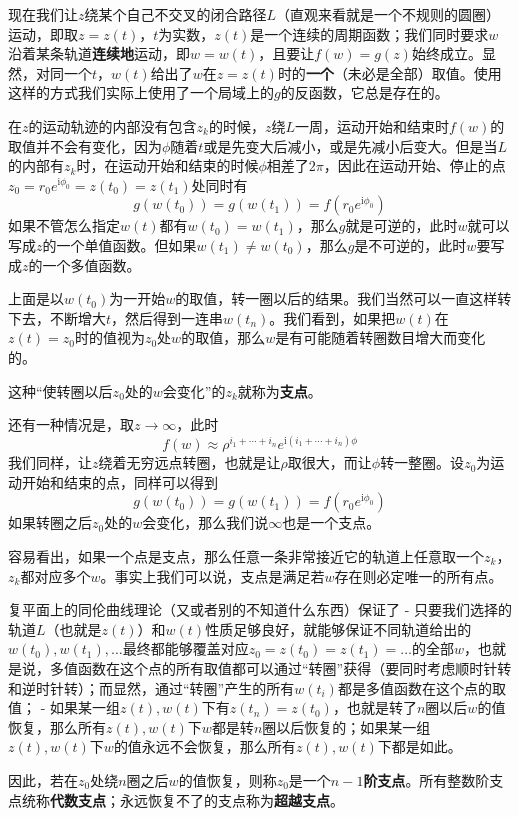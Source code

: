 \documentclass[UTF8]{ctexart}
\begin{document}
现在我们让$z$绕某个自己不交叉的闭合路径$L$（直观来看就是一个不规则的圆圈）运动，即取$z=z(t)$，$t$为实数，$z(t)$是一个连续的周期函数；我们同时要求$w$沿着某条轨道\textbf{连续地}运动，即$w=w(t)$，且要让$f(w)=g(z)$始终成立。显然，对同一个$t$，$w(t)$给出了$w$在$z=z(t)$时的\textbf{一个}（未必是全部）取值。使用这样的方式我们实际上使用了一个局域上的$g$的反函数，它总是存在的。

在$z$的运动轨迹的内部没有包含$z_k$的时候，$z$绕$L$一周，运动开始和结束时$f(w)$的取值并不会有变化，因为$\phi$随着$t$或是先变大后减小，或是先减小后变大。但是当$L$的内部有$z_k$时，在运动开始和结束的时候$\phi$相差了$2\pi$，因此在运动开始、停止的点$z_0 = r_0 e^{\mathrm{i}\phi_0}=z(t_0)=z(t_1)$处同时有
\[
g(w(t_0)) = g(w(t_1)) = f(r_0 e^{\mathrm{i}\phi_0})
\]
如果不管怎么指定$w(t)$都有$w(t_0)=w(t_1)$，那么$g$就是可逆的，此时$w$就可以写成$z$的一个单值函数。但如果$w(t_1) \neq w(t_0)$，那么$g$是不可逆的，此时$w$要写成$z$的一个多值函数。

上面是以$w(t_0)$为一开始$w$的取值，转一圈以后的结果。我们当然可以一直这样转下去，不断增大$t$，然后得到一连串$w(t_n)$。我们看到，如果把$w(t)$在$z(t)=z_0$时的值视为$z_0$处$w$的取值，那么$w$是有可能随着转圈数目增大而变化的。

这种``使转圈以后$z_0$处的$w$会变化''的$z_k$就称为\textbf{支点}。

还有一种情况是，取$z \rightarrow \infty$，此时 \[
f(w) \approx \rho^{i_1 + \cdots + i_n} e^{\mathrm{i}(i_1 + \cdots + i_n)\phi}
\]
我们同样，让$z$绕着无穷远点转圈，也就是让$\rho$取很大，而让$\phi$转一整圈。设$z_0$为运动开始和结束的点，同样可以得到
\[
g(w(t_0)) = g(w(t_1)) = f(r_0 e^{\mathrm{i}\phi_0})
\]
如果转圈之后$z_0$处的$w$会变化，那么我们说$\infty$也是一个支点。

容易看出，如果一个点是支点，那么任意一条非常接近它的轨道上任意取一个$z_k$，$z_k$都对应多个$w$。事实上我们可以说，支点是满足若$w$存在则必定唯一的所有点。

复平面上的同伦曲线理论（又或者别的不知道什么东西）保证了 -
只要我们选择的轨道$L$（也就是$z(t)$）和$w(t)$性质足够良好，就能够保证不同轨道给出的$w(t_0), w(t_1), \ldots$最终都能够覆盖对应$z_0=z(t_0)=z(t_1)=\ldots$的全部$w$，也就是说，多值函数在这个点的所有取值都可以通过``转圈''获得（要同时考虑顺时针转和逆时针转）；而显然，通过``转圈''产生的所有$w(t_i)$都是多值函数在这个点的取值；
-
如果某一组$z(t), w(t)$下有$z(t_n)=z(t_0)$，也就是转了$n$圈以后$w$的值恢复，那么所有$z(t), w(t)$下$w$都是转$n$圈以后恢复的；如果某一组$z(t), w(t)$下$w$的值永远不会恢复，那么所有$z(t), w(t)$下都是如此。

因此，若在$z_0$处绕$n$圈之后$w$的值恢复，则称$z_0$是一个$n-1$\textbf{阶支点}。所有整数阶支点统称\textbf{代数支点}；永远恢复不了的支点称为\textbf{超越支点}。
\end{document}
